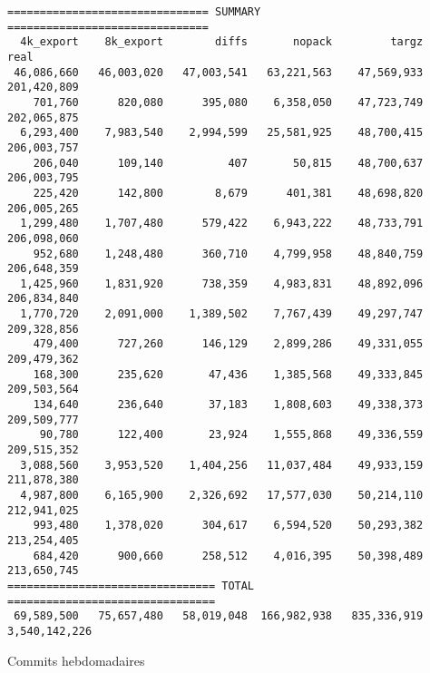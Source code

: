 \documentclass[a4paper,twocolumn]{article}
\begin{document}
\begin{table*}[ht]
\begin{verbatim}
=============================== SUMMARY ===============================
  4k_export    8k_export        diffs       nopack         targz           real
 46,086,660   46,003,020   47,003,541   63,221,563    47,569,933    201,420,809
    701,760      820,080      395,080    6,358,050    47,723,749    202,065,875
  6,293,400    7,983,540    2,994,599   25,581,925    48,700,415    206,003,757
    206,040      109,140          407       50,815    48,700,637    206,003,795
    225,420      142,800        8,679      401,381    48,698,820    206,005,265
  1,299,480    1,707,480      579,422    6,943,222    48,733,791    206,098,060
    952,680    1,248,480      360,710    4,799,958    48,840,759    206,648,359
  1,425,960    1,831,920      738,359    4,983,831    48,892,096    206,834,840
  1,770,720    2,091,000    1,389,502    7,767,439    49,297,747    209,328,856
    479,400      727,260      146,129    2,899,286    49,331,055    209,479,362
    168,300      235,620       47,436    1,385,568    49,333,845    209,503,564
    134,640      236,640       37,183    1,808,603    49,338,373    209,509,777
     90,780      122,400       23,924    1,555,868    49,336,559    209,515,352
  3,088,560    3,953,520    1,404,256   11,037,484    49,933,159    211,878,380
  4,987,800    6,165,900    2,326,692   17,577,030    50,214,110    212,941,025
    993,480    1,378,020      304,617    6,594,520    50,293,382    213,254,405
    684,420      900,660      258,512    4,016,395    50,398,489    213,650,745
================================ TOTAL ================================
 69,589,500   75,657,480   58,019,048  166,982,938   835,336,919  3,540,142,226
\end{verbatim}
\caption{Commits hebdomadaires}
\label{tab:weekly-commits}
\end{table*}
\end{document}
